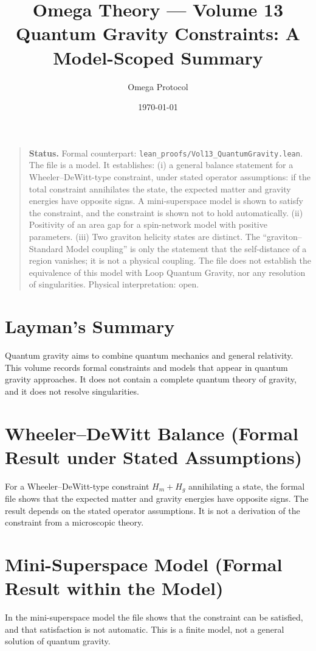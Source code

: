 \documentclass[11pt, a4paper]{article}
\title{Omega Theory --- Volume 13\\\Large Quantum Gravity Constraints: A Model-Scoped Summary}
\author{Omega Protocol}
\date{\today}
\begin{document}
\maketitle

\begin{quote}
\textbf{Status.} Formal counterpart: \texttt{lean\_proofs/Vol13\_QuantumGravity.lean}. The file is a model. It establishes: (i) a general balance statement for a Wheeler--DeWitt-type constraint, under stated operator assumptions: if the total constraint annihilates the state, the expected matter and gravity energies have opposite signs. A mini-superspace model is shown to satisfy the constraint, and the constraint is shown not to hold automatically. (ii) Positivity of an area gap for a spin-network model with positive parameters. (iii) Two graviton helicity states are distinct. The ``graviton--Standard Model coupling'' is only the statement that the self-distance of a region vanishes; it is not a physical coupling. The file does not establish the equivalence of this model with Loop Quantum Gravity, nor any resolution of singularities. Physical interpretation: open.
\end{quote}

\section*{Layman's Summary}
Quantum gravity aims to combine quantum mechanics and general relativity. This volume records formal constraints and models that appear in quantum gravity approaches. It does not contain a complete quantum theory of gravity, and it does not resolve singularities.

\section{Wheeler--DeWitt Balance (Formal Result under Stated Assumptions)}
For a Wheeler--DeWitt-type constraint $H_m + H_g$ annihilating a state, the formal file shows that the expected matter and gravity energies have opposite signs. The result depends on the stated operator assumptions. It is not a derivation of the constraint from a microscopic theory.

\section{Mini-Superspace Model (Formal Result within the Model)}
In the mini-superspace model the file shows that the constraint can be satisfied, and that satisfaction is not automatic. This is a finite model, not a general solution of quantum gravity.
\end{document}
